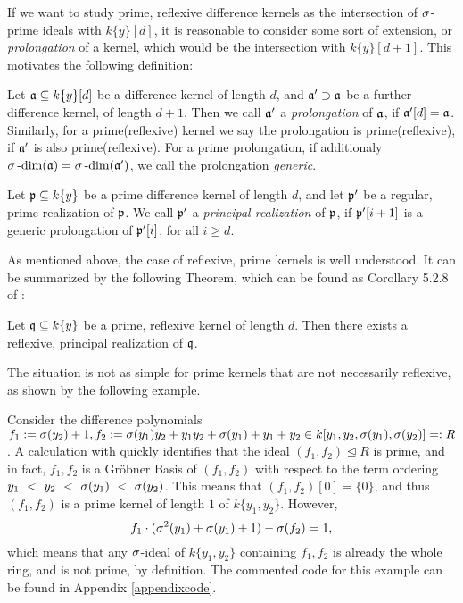 If we want to study prime, reflexive difference kernels as the intersection of $\sigma$-prime ideals with $k\{y\}[d]$,
it is reasonable to consider some sort of extension, or \emph{prolongation} of a kernel, which would be the intersection with $k\{y\}[d+1]$.  
This motivates the following definition: 

\begin{defn}
Let $\mathfrak{a} \subseteq k\{y\}[d]$ be a difference kernel of length $d$, and $\mathfrak{a}' \supset \mathfrak{a}$ be a further difference kernel, of length $d+1$.
Then we call $\mathfrak{a}'$ a \emph{prolongation} of $\mathfrak{a}$, if $\mathfrak{a}'[d] = \mathfrak{a}$. Similarly, for a prime(reflexive) kernel we say the prolongation is prime(reflexive), if $\mathfrak{a}'$ is also prime(reflexive).
For a prime prolongation, if additionaly $\sigma\operatorname{-dim}(\mathfrak{a}) = \sigma\operatorname{-dim}(\mathfrak{a}')$, we call the prolongation \emph{generic}.
\end{defn}

\begin{defn}
Let $\mathfrak{p} \subseteq k\{y\}$ be a prime difference kernel of length $d$, and let $\mathfrak{p}'$ be a regular, prime realization of $\mathfrak{p}$. We call $\mathfrak{p}'$ a \emph{principal realization} of $\mathfrak{p}$, if $\mathfrak{p}'[i+1]$ is a generic prolongation of $\mathfrak{p}'[i]$, for all $i \geq d$. 
\end{defn}

As mentioned above, the case of reflexive, prime kernels is well understood. It can be summarized by the following Theorem, which can be found as Corollary 5.2.8 of \cite{wibmer}:
\begin{theorem}\label{reflexiverealization}
Let $\mathfrak{q} \subseteq k\{y\}$ be a prime, reflexive kernel of length $d$. Then there exists a reflexive, principal realization of $\mathfrak{q}$. 
\end{theorem}

The situation is not as simple for prime kernels that are not necessarily reflexive, as shown by the following example.

\begin{ex}\label{counterexker}
Consider the difference polynomials $f_1 := \sigma(y_2) + 1, f_2:= \sigma(y_1)y_2 + y_1y_2 + \sigma(y_1) + y_1 + y_2 \in k[y_1,y_2,\sigma(y_1),\sigma(y_2)] =: R$.
A calculation with \cite{M2} quickly identifies that the ideal $(f_1,f_2) \unlhd R$ is prime, and in fact, $f_1,f_2$ is a Gr\"{o}bner Basis of $(f_1,f_2)$ with respect to the
term ordering $y_1~<~y_2~<~\sigma(y_1)~<~\sigma(y_2)$. This means that $(f_1,f_2)[0] = \{0\}$, and thus $(f_1,f_2)$ is a prime kernel of length $1$ of $k\{y_1,y_2\}$. However,
\[ f_1 \cdot (\sigma^2(y_1) + \sigma(y_1) + 1 ) - \sigma(f_2) = 1, \]
which means that any $\sigma$-ideal of $k\{y_1,y_2\}$ containing $f_1, f_2$ is already the whole ring, and is not prime, by definition.
The commented code for this example can be found in Appendix \ref{appendixcode}.
\end{ex}

